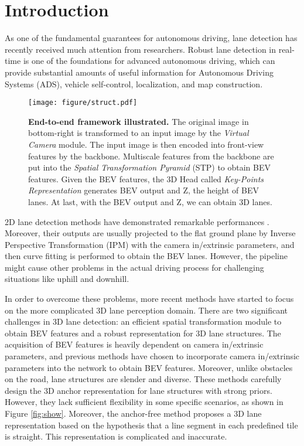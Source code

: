 \documentclass[10pt,twocolumn,letterpaper]{article}
\begin{document}
\section{Introduction}
\label{sec:introduction}
As one of the fundamental guarantees for autonomous driving, lane detection has recently received much attention from researchers. Robust lane detection in real-time is one of the foundations for advanced autonomous driving, which can provide substantial amounts of useful information for Autonomous Driving Systems (ADS), vehicle self-control, localization, and map construction.
\begin{figure}[ht]
    \centering
\texttt{[image: figure/struct.pdf]}
\caption{\textbf{End-to-end framework illustrated.} The original image in bottom-right is transformed to an input image by the \textit{Virtual Camera} module. The input image is then encoded into front-view features by the backbone. Multiscale features from the backbone are put into the \textit{Spatial Transformation Pyramid} (STP) to obtain BEV features. Given the BEV features, the 3D Head called \textit{Key-Points Representation} generates BEV output and Z, the height of BEV lanes. At last, with the BEV output and Z, we can obtain 3D lanes.}
    \label{fig:struct}
\end{figure}

2D lane detection methods have demonstrated remarkable performances \cite{cordts2016cityscapes,pan2018spatial,neven2018towards,liu2021condlanenet}. Moreover, their outputs are usually projected to the flat ground plane by Inverse Perspective Transformation (IPM) with the camera in/extrinsic parameters, and then curve fitting is performed to obtain the BEV lanes. However, the pipeline might cause other problems in the actual driving process \cite{bai2018deep,neven2018towards} for challenging situations like uphill and downhill.

In order to overcome these problems, more recent methods \cite{garnett20193d,efrat20203d,guo2020gen,li2022reconstruct,chen2022persformer} have started to focus on the more complicated 3D lane perception domain. There are two significant challenges in 3D lane detection: an efficient spatial transformation module to obtain BEV features and a robust representation for 3D lane structures. The acquisition of BEV features is heavily dependent on camera in/extrinsic parameters, and previous methods have chosen to incorporate camera in/extrinsic parameters into the network to obtain BEV features. Moreover, unlike obstacles on the road, lane structures are slender and diverse. These methods \cite{garnett20193d, guo2020gen, chen2022persformer} carefully design the 3D anchor representation for lane structures with strong priors. However, they lack sufficient flexibility in some specific scenarios, as shown in Figure \ref{fig:show}. Moreover, the anchor-free method \cite{efrat20203d} proposes a 3D lane representation based on the hypothesis that a line segment in each predefined tile is straight. This representation is complicated and inaccurate.
\end{document}
